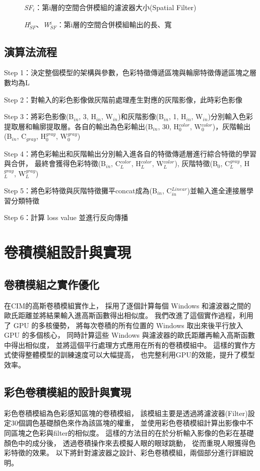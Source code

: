 \documentclass[class=NCU_thesis, crop=false]{standalone}
\begin{document}
\begin{description}
		\item[]\textit{SF}$_{i}$：第i層的空間合併模組的濾波器大小(Spatial Filter)
		\item[]\textit{H}$^{i}_{SF}$、\textit{W}$^{i}_{SF}$：第i層的空間合併模組輸出的長、寬
	\end{description}
\subsection{演算法流程}
Step 1：決定整個模型的架構與參數，色彩特徵傳遞區塊與輪廓特徵傳遞區塊之層數均為L

Step 2：對輸入的彩色影像做灰階前處理產生對應的灰階影像，此時彩色影像

Step 3：將彩色影像(B$_{in}$, 3, H$_{in}$, W$_{in}$)和灰階影像(B$_{in}$, 1, H$_{in}$, W$_{in}$)分別輸入色彩提取層和輪廓提取層。各自的輸出為色彩輸出(B$_{in}$, 30, H$^{color}_{0}$, W$^{color}_{0}$)，灰階輸出(B$_{in}$, C${_{gray}}$, H$^{gray}_{0}$, W$^{gray}_{0}$)

Step 4：將色彩輸出和灰階輸出分別輸入進各自的特徵傳遞層進行綜合特徵的學習與合併，
		最終會獲得色彩特徵(B$_{in}$, C$^{color}_{L}$, H$^{color}_{L}$, W$^{color}_{L}$), 灰階特徵(B$_{0}$, C$^{gray}_{L}$, H$^{gray}_{L}$, W$^{gray}_{L}$)

Step 5：將色彩特徵與灰階特徵攤平concat成為(B$_{in}$, C$^{Linear}_{in}$)並輸入進全連接層學習分類特徵

Step 6：計算 loss value 並進行反向傳播


\pagebreak

\section{卷積模組設計與實現}
	\subsection{卷積模組之實作優化}
		在CIM的高斯卷積模組實作上，
		採用了逐個計算每個 Windows 和濾波器之間的歐氏距離並將結果輸入進高斯函數得出相似度。
		我們改進了這個實作過程，利用了 GPU 的多核優勢，
		將每次卷積的所有位置的 Windows 取出來後平行放入 GPU 的多個核心，
		同時計算這些 Windows 與濾波器的歐氏距離再輸入高斯函數中得出相似度，
		並將這個平行處理方式應用在所有的卷積模組中。
		這樣的實作方式使得整體模型的訓練速度可以大幅提高，
		也完整利用GPU的效能，提升了模型效率。

	\subsection{彩色卷積模組的設計與實現}
		彩色卷積模組為色彩感知區塊的卷積模組，
		該模組主要是透過將濾波器(Filter)設定30個調色基礎顏色來作為該區塊的權重，
		並使用彩色卷積模組計算出影像中不同區塊之色彩與filter的相似度。
		這樣的方法目的在於分析輸入影像的色彩在基礎顏色中的成分後，
		透過卷積操作來去模擬人眼的眼球跳動，
		從而重現人眼獲得色彩特徵的效果。
		以下將針對濾波器之設計、彩色卷積模組，兩個部分進行詳細說明。
		\pagebreak
		
\end{document}
